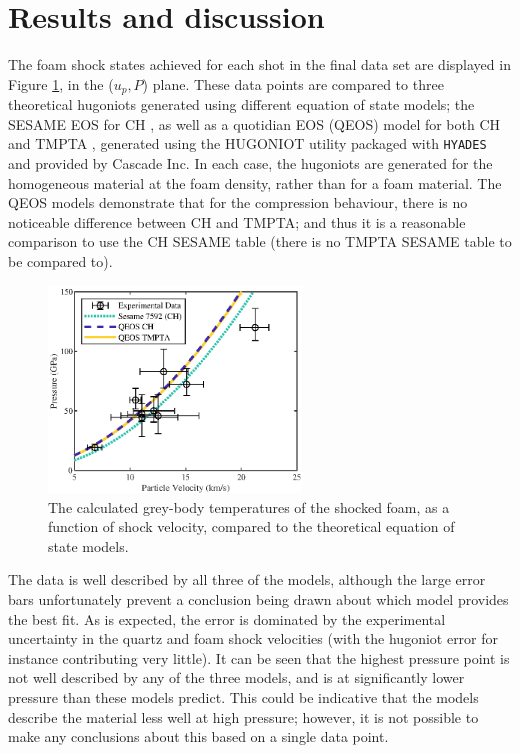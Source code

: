 \section{Results and discussion} \label{Experiment Results}

The foam shock states achieved for each shot in the final data set are displayed in Figure \ref{fig:Hugoniot Results}, in the ($u_p,P$) plane. These data points are compared to three theoretical hugoniots generated using different equation of state models; the SESAME EOS for CH \cite{SESAME}, as well as a quotidian EOS (QEOS) model for both CH and TMPTA \cite{More1988}, generated using the HUGONIOT utility packaged with \texttt{HYADES} and provided by Cascade Inc. In each case, the hugoniots are generated for the homogeneous material at the foam density, rather than for a foam material. The QEOS models demonstrate that for the compression behaviour, there is no noticeable difference between CH and TMPTA; and thus it is a reasonable comparison to use the CH SESAME table (there is no TMPTA SESAME table to be compared to).

\begin{figure} [h!]
\begin{centering}
\includegraphics[width=0.6\textwidth]{figures/Experiment/Hugoniot.eps}%
\caption{\label{fig:Hugoniot Results} The calculated grey-body temperatures of the shocked foam, as a function of shock velocity, compared to the theoretical equation of state models.}
\end{centering}
\end{figure}

The data is well described by all three of the models, although the large error bars unfortunately prevent a conclusion being drawn about which model provides the best fit. As is expected, the error is dominated by the experimental uncertainty in the quartz and foam shock velocities (with the hugoniot error for instance contributing very little). It can be seen that the highest pressure point is not well described by any of the three models, and is at significantly lower pressure than these models predict. This could be indicative that the models describe the material less well at high pressure; however, it is not possible to make any conclusions about this based on a single data point.

